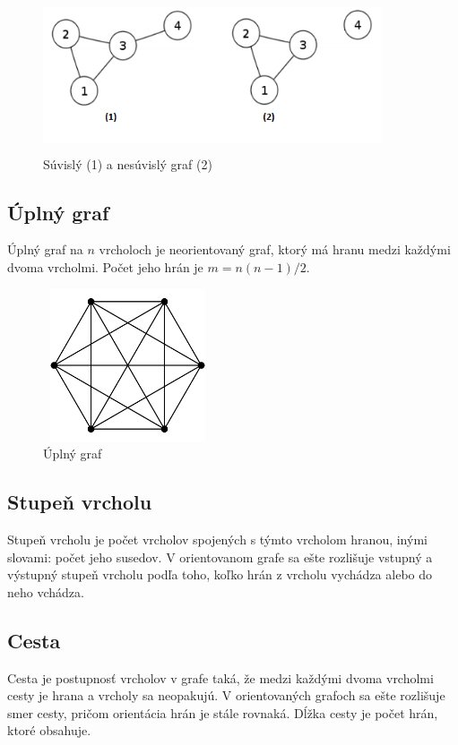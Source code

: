 \documentclass[slovak,master,public,dept460,male,cpdeclaration,oneside]{diploma}
\begin{document}
\begin{figure}[H]
\centering
\includegraphics[width=10cm,height=4.5cm]{figures/suvisly_vs_nesuvisly}
\caption{Súvislý (1) a nesúvislý graf (2)}
\end{figure}


\subsection{Úplný graf}

Úplný graf na ${n}$ vrcholoch je neorientovaný graf, ktorý má hranu medzi každými dvoma vrcholmi. Počet jeho hrán je ${m = n ( n - 1) / 2}$.

\begin{figure}[H]
\centering
\includegraphics[width=5cm,height=4.5cm]{figures/uplnygraf}
\caption{Úplný graf}
\end{figure}


\subsection{Stupeň vrcholu}

Stupeň vrcholu je počet vrcholov spojených s týmto vrcholom hranou, inými slovami: počet jeho susedov. V orientovanom grafe sa ešte rozlišuje vstupný a výstupný stupeň vrcholu podľa toho, koľko hrán z vrcholu vychádza alebo do neho vchádza.

\subsection{Cesta}

Cesta je postupnosť vrcholov v grafe taká, že medzi každými dvoma vrcholmi cesty je hrana a vrcholy sa neopakujú. V orientovaných grafoch sa ešte rozlišuje smer cesty, pričom orientácia hrán je stále rovnaká. Dĺžka cesty je počet hrán, ktoré obsahuje.
\end{document}
